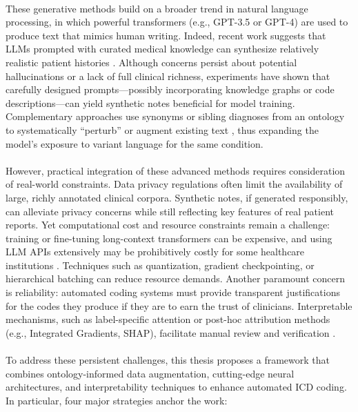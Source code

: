 \paragraph{}
These generative methods build on a broader trend in natural language processing, in which powerful transformers (e.g., GPT-3.5 or GPT-4) are used to produce text that mimics human writing. Indeed, recent work suggests that LLMs prompted with curated medical knowledge can synthesize relatively realistic patient histories \citep{yang2023fewshoticd}. Although concerns persist about potential hallucinations or a lack of full clinical richness, experiments have shown that carefully designed prompts—possibly incorporating knowledge graphs or code descriptions—can yield synthetic notes beneficial for model training. Complementary approaches use synonyms or sibling diagnoses from an ontology to systematically “perturb” or augment existing text \citep{yuan2022codesynonyms}, thus expanding the model’s exposure to variant language for the same condition.

\paragraph{}
However, practical integration of these advanced methods requires consideration of real-world constraints. Data privacy regulations often limit the availability of large, richly annotated clinical corpora. Synthetic notes, if generated responsibly, can alleviate privacy concerns while still reflecting key features of real patient reports. Yet computational cost and resource constraints remain a challenge: training or fine-tuning long-context transformers can be expensive, and using LLM APIs extensively may be prohibitively costly for some healthcare institutions \citep{ji2021bert}. Techniques such as quantization, gradient checkpointing, or hierarchical batching \citep{geiping2023cramming} can reduce resource demands. Another paramount concern is reliability: automated coding systems must provide transparent justifications for the codes they produce if they are to earn the trust of clinicians. Interpretable mechanisms, such as label-specific attention or post-hoc attribution methods (e.g., Integrated Gradients, SHAP), facilitate manual review and verification \citep{teng2020explainable}.

\paragraph{}
To address these persistent challenges, this thesis proposes a framework that combines ontology-informed data augmentation, cutting-edge neural architectures, and interpretability techniques to enhance automated ICD coding. In particular, four major strategies anchor the work:

